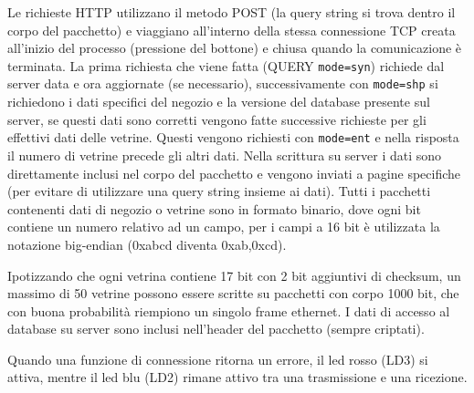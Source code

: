 Le richieste HTTP utilizzano il metodo POST (la query string si trova dentro il corpo del pacchetto) e viaggiano all'interno della stessa connessione TCP creata all'inizio del processo (pressione del bottone) e chiusa quando la comunicazione \`{e} terminata. La prima richiesta che viene fatta (QUERY \texttt{mode=syn}) richiede dal server data e ora aggiornate (se necessario), successivamente con \texttt{mode=shp} si richiedono i dati specifici del negozio e la versione del database presente sul server, se questi dati sono corretti vengono fatte successive richieste per gli effettivi dati delle vetrine. Questi vengono richiesti con \texttt{mode=ent} e nella risposta il numero di vetrine precede gli altri dati. Nella scrittura su server i dati sono direttamente inclusi nel corpo del pacchetto e vengono inviati a pagine specifiche (per evitare di utilizzare una query string insieme ai dati). Tutti i pacchetti contenenti dati di negozio o vetrine sono in formato binario, dove ogni bit contiene un numero relativo ad un campo, per i campi a 16 bit \`{e} utilizzata la notazione big-endian (0xabcd diventa 0xab,0xcd). 

Ipotizzando che ogni vetrina contiene 17 bit con 2 bit aggiuntivi di checksum, un massimo di 50 vetrine possono essere scritte su pacchetti con corpo 1000 bit, che con buona probabilit\`{a} riempiono un singolo frame ethernet. I dati di accesso al database su server sono inclusi nell'header del pacchetto (sempre criptati).

Quando una funzione di connessione ritorna un errore, il led rosso (LD3) si attiva, mentre il led blu (LD2) rimane attivo tra una trasmissione e una ricezione.

